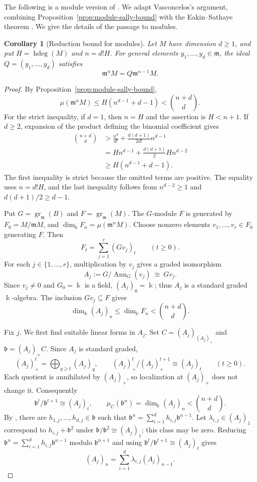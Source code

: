 \documentclass[11pt,reqno]{amsart}
\numberwithin{equation}{section}
\newtheorem{corollary}[theorem]{Corollary}
\theoremstyle{definition}
\newcommand{\m}{\mathfrak m}
\newcommand{\hdeg}{\operatorname{hdeg}}
\newcommand{\Ann}{\operatorname{Ann}}
\begin{document}
The following is a module version of
\cite[Corollary~3.6]{Vasconcelos1998}.
We adapt Vasconcelos's argument, combining
Proposition~\ref{prop:module-sally-bound} with the
Eakin--Sathaye theorem \cite[Theorem~1]{EakinSathaye1976}.
We give the details of the passage to modules.

\begin{corollary}[Reduction bound for modules]
\label{cor:module-reduction-bound}
Let $M$ have dimension $d\geq1$, and put $H=\hdeg(M)$ and
$n=d!H$.  For general elements $y_1,\ldots,y_d\in\m$, the ideal
$Q=(y_1,\ldots,y_d)$ satisfies
\begin{equation}
 \m^nM=Q\m^{n-1}M.
 \label{eq:module-reduction-equality}
\end{equation}
\end{corollary}

\begin{proof}
By Proposition~\ref{prop:module-sally-bound},
\[
 \mu(\m^nM)\leq H(n^{d-1}+d-1)<\binom{n+d}{d}.
\]
For the strict inequality, if $d=1$, then $n=H$ and the assertion
is $H<n+1$. If $d\geq2$, expansion of the product defining the
binomial coefficient gives
\begin{align*}
 \binom{n+d}{d}
 &>\frac{n^d}{d!}+\frac{d(d+1)}{2d!}n^{d-1}\\
 &=Hn^{d-1}+\frac{d(d+1)}2Hn^{d-2}\\
 &\geq H(n^{d-1}+d-1).
\end{align*}
The first inequality is strict because the omitted terms are positive.
The equality uses $n=d!H$, and the last inequality follows from
$n^{d-2}\geq1$ and $d(d+1)/2\geq d-1$.

Put $G=\operatorname{gr}_{\m}(B)$ and
$F=\operatorname{gr}_{\m}(M)$. The $G$-module $F$ is generated
by $F_0=M/\m M$, and
$\dim_{\Bbbk}F_n=\mu(\m^nM)$.
Choose nonzero elements $v_1,\ldots,v_r\in F_0$ generating $F$.
Then
\[
 F_t=\sum_{j=1}^r(Gv_j)_t\qquad(t\geq0).
\]
For each $j\in\{1,\ldots,r\}$, multiplication by $v_j$ gives a
graded isomorphism
\[
 A_j:=G/\Ann_G(v_j)\ \cong\ Gv_j.
\]
Since $v_j\ne0$ and $G_0=\Bbbk$ is a field, $(A_j)_0=\Bbbk$;
thus $A_j$ is a standard graded $\Bbbk$-algebra.
The inclusion $Gv_j\subseteq F$ gives
\[
 \dim_{\Bbbk}(A_j)_n
 \leq\dim_{\Bbbk}F_n<\binom{n+d}{d}.
\]

Fix $j$. We first find suitable linear forms in $A_j$.
Set $C=(A_j)_{(A_j)_+}$ and $\mathfrak b=(A_j)_+C$.
Since $A_j$ is standard graded,
\[
 (A_j)_+^t=\bigoplus_{q\geq t}(A_j)_q,\qquad
 (A_j)_+^t/(A_j)_+^{t+1}\cong(A_j)_t
 \qquad(t\geq0).
\]
Each quotient is annihilated by $(A_j)_+$, so localization at
$(A_j)_+$ does not change it. Consequently
\[
 \mathfrak b^t/\mathfrak b^{t+1}\cong(A_j)_t,\qquad
 \mu_C(\mathfrak b^n)=\dim_{\Bbbk}(A_j)_n<\binom{n+d}{d}.
\]
By \cite[Theorem~1]{EakinSathaye1976}, there are
$h_{1,j},\ldots,h_{d,j}\in\mathfrak b$ such that
$\mathfrak b^n=\sum_{i=1}^d h_{i,j}\mathfrak b^{n-1}$.
Let $\lambda_{i,j}\in(A_j)_1$ correspond to
$h_{i,j}+\mathfrak b^2$ under
$\mathfrak b/\mathfrak b^2\cong(A_j)_1$; this class may be zero.
Reducing
$\mathfrak b^n=\sum_{i=1}^d h_{i,j}\mathfrak b^{n-1}$
modulo $\mathfrak b^{n+1}$ and using
$\mathfrak b^t/\mathfrak b^{t+1}\cong(A_j)_t$ gives
\[
 (A_j)_n=\sum_{i=1}^d\lambda_{i,j}(A_j)_{n-1}.
\]


\end{proof}
\end{document}
